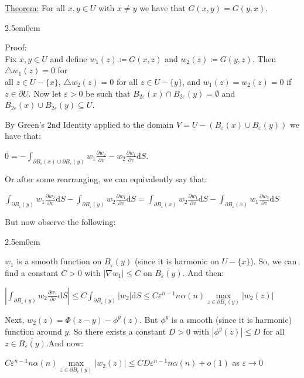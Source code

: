 \documentclass{book}
\newcommand{\exTwo}{%
   \color{Purple}%
   \fontsize{13}{15}\selectfont%
}
\newcommand{\exThreeP}{%
   \color{RedViolet}%
   \fontsize{12}{14}\selectfont%
}
\newcommand{\exPPP}{%
   \color{VioletRed}%
   \fontsize{12}{14}\selectfont%
}
\newenvironment{myIndent}{%
   \begin{adjustwidth}{2.5em}{0em}%
}{%
   \end{adjustwidth}%
}
\newcommand{\df}{\mathrm{d}}
\newcommand{\retTwo}{\hfill\bigbreak}
\begin{document}
\exTwo\ul{Theorem:} For all $x, y \in U$ with $x \neq y$ we have that $G(x, y) = G(y, x)$.
\begin{myIndent}\exThreeP
	Proof:\\
	Fix $x, y \in U$ and define $w_1(z) \coloneqq G(x, z)$ and $w_2(z) \coloneqq G(y, z)$. Then $\triangle w_1(z) = 0$ for\\ all $z \in U - \{x\}$, $\triangle w_2(z) = 0$ for all $z \in U - \{y\}$, and $w_1(z) = w_2(z) = 0$ if $z \in \partial U$. Now let $\varepsilon > 0$ be such that $B_{2\varepsilon}(x) \cap B_{2\varepsilon}(y) = \emptyset$ and $B_{2\varepsilon}(x) \cup B_{2\varepsilon}(y) \subseteq U$.\retTwo
	
	By {\color{OliveGreen}Green's 2nd Identity} applied to the domain $V = U - (B_{\varepsilon}(x) \cup B_{\varepsilon}(y))$ we have that:

	{\centering $0 = -\int_{\partial B_\varepsilon(x) \cup \partial B_\varepsilon(y)} w_1 \frac{\partial w_2}{\partial v} - w_2 \frac{\partial w_1}{\partial v}\df S$. \retTwo\par}

	Or after some rearranging, we can equivalently say that:

	{\centering $ \int_{\partial B_\varepsilon(y)}w_1 \frac{\partial w_2}{\partial v}\df S - \int_{\partial B_\varepsilon(y)}  w_2 \frac{\partial w_1}{\partial v}\df S =  \int_{\partial B_\varepsilon(x)} w_2 \frac{\partial w_1}{\partial v}\df S - \int_{\partial B_\varepsilon(x)} w_1 \frac{\partial w_2}{\partial v} \df S$ \retTwo\par}

	But now observe the following:
	\begin{myIndent}\exPPP
		$w_1$ is a smooth function on $B_\varepsilon(y)$ (since it is harmonic on $U - \{x\}$). So, we can find a constant $C > 0$ with $|\nabla w_1| \leq C$ on $\overline{B_\varepsilon(y)}$. And then:

		{\centering $\left|\int_{\partial B_\varepsilon(y)}  w_2 \frac{\partial w_1}{\partial v}\df S\right| \leq C\int_{\partial B_\varepsilon(y)} |w_2|\df S \leq C\varepsilon^{n-1} n\alpha(n) \max\limits_{z \in \partial B_\varepsilon(y)}|w_2(z)|$ \retTwo\par}

		Next, $w_2(z) = \Phi(z - y) - \phi^y(z)$. But $\phi^y$ is a smooth (since it is harmonic) function around $y$. So there exists a constant $D > 0$ with $|\phi^y(z)| \leq D$ for all $z \in \overline{B_\varepsilon(y)}$.\newpage And now:

		{\centering $ C\varepsilon^{n-1} n\alpha(n) \max\limits_{z \in \partial B_\varepsilon(y)}|w_2(z)| \leq CD\varepsilon^{n-1} n \alpha(n) + o(1)$ as $\varepsilon \to 0$ \retTwo\par}


\end{myIndent}
\end{myIndent}
\end{document}
